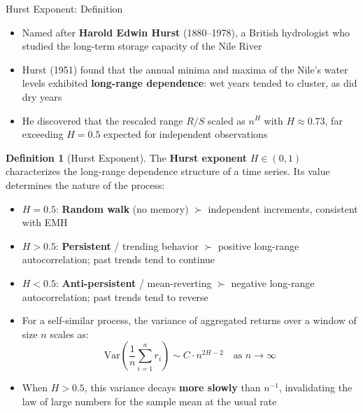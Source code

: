 \documentclass[9pt, aspectratio=169, t]{beamer}
\theoremstyle{definition}
\newtheorem{defn}{Definition}
\newcommand{\Var}{\text{Var}}
\begin{document}
\begin{frame}{Hurst Exponent: Definition}
    \begin{itemize}
        \item Named after \textbf{Harold Edwin Hurst} (1880--1978), a British hydrologist who studied the long-term storage capacity of the Nile River
        \item Hurst (1951) found that the annual minima and maxima of the Nile's water levels exhibited \textbf{long-range dependence}: wet years tended to cluster, as did dry years
        \item He discovered that the rescaled range $R/S$ scaled as $n^H$ with $H \approx 0.73$, far exceeding $H = 0.5$ expected for independent observations
    \end{itemize}
    \begin{defn}[Hurst Exponent]
        The \textbf{Hurst exponent} $H \in (0, 1)$ characterizes the long-range dependence structure of a time series. Its value determines the nature of the process:
        \begin{itemize}
            \item $H = 0.5$: \textbf{Random walk} (no memory) $\succ$ independent increments, consistent with EMH
            \item $H > 0.5$: \textbf{Persistent} / trending behavior $\succ$ positive long-range autocorrelation; past trends tend to continue
            \item $H < 0.5$: \textbf{Anti-persistent} / mean-reverting $\succ$ negative long-range autocorrelation; past trends tend to reverse
        \end{itemize}
    \end{defn}
    \begin{itemize}
        \item For a self-similar process, the variance of aggregated returns over a window of size $n$ scales as:
        \[
            \Var\!\left(\frac{1}{n}\sum_{i=1}^n r_i\right) \sim C \cdot n^{2H - 2} \quad \text{as } n \to \infty
        \]
        \item When $H > 0.5$, this variance decays \textbf{more slowly} than $n^{-1}$, invalidating the law of large numbers for the sample mean at the usual rate
    \end{itemize}
\end{frame}
\end{document}
